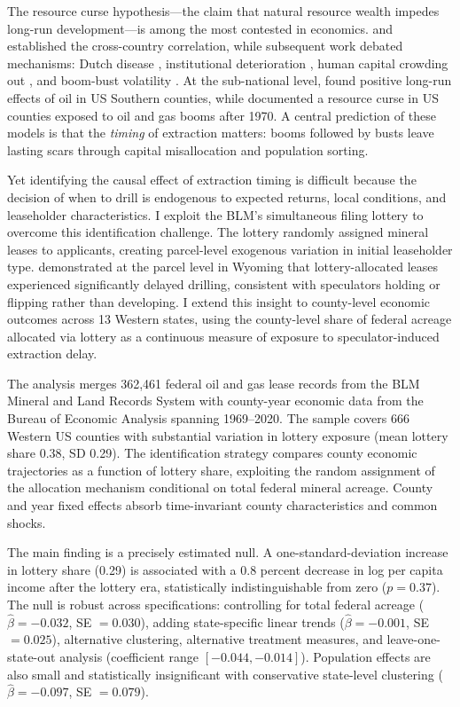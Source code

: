 \documentclass[12pt]{article}
\begin{document}
The resource curse hypothesis---the claim that natural resource wealth impedes long-run development---is among the most contested in economics. \citet{sachs1995natural} and \citet{sachs2001curse} established the cross-country correlation, while subsequent work debated mechanisms: Dutch disease \citep{corden1984booming}, institutional deterioration \citep{mehlum2006institutions, robinson2006governance}, human capital crowding out \citep{gylfason2001natural}, and boom-bust volatility \citep{vanderploeg2011natural}. At the sub-national level, \citet{michaels2011comparative} found positive long-run effects of oil in US Southern counties, while \citet{allcott2018dutch} documented a resource curse in US counties exposed to oil and gas booms after 1970. A central prediction of these models is that the \textit{timing} of extraction matters: booms followed by busts leave lasting scars through capital misallocation and population sorting.

Yet identifying the causal effect of extraction timing is difficult because the decision of when to drill is endogenous to expected returns, local conditions, and leaseholder characteristics. I exploit the BLM's simultaneous filing lottery to overcome this identification challenge. The lottery randomly assigned mineral leases to applicants, creating parcel-level exogenous variation in initial leaseholder type. \citet{brehm2021speculator} demonstrated at the parcel level in Wyoming that lottery-allocated leases experienced significantly delayed drilling, consistent with speculators holding or flipping rather than developing. I extend this insight to county-level economic outcomes across 13 Western states, using the county-level share of federal acreage allocated via lottery as a continuous measure of exposure to speculator-induced extraction delay.

The analysis merges 362,461 federal oil and gas lease records from the BLM Mineral and Land Records System with county-year economic data from the Bureau of Economic Analysis spanning 1969--2020. The sample covers 666 Western US counties with substantial variation in lottery exposure (mean lottery share 0.38, SD 0.29). The identification strategy compares county economic trajectories as a function of lottery share, exploiting the random assignment of the allocation mechanism conditional on total federal mineral acreage. County and year fixed effects absorb time-invariant county characteristics and common shocks.

The main finding is a precisely estimated null. A one-standard-deviation increase in lottery share (0.29) is associated with a 0.8 percent decrease in log per capita income after the lottery era, statistically indistinguishable from zero ($p = 0.37$). The null is robust across specifications: controlling for total federal acreage ($\hat{\beta} = -0.032$, SE $= 0.030$), adding state-specific linear trends ($\hat{\beta} = -0.001$, SE $= 0.025$), alternative clustering, alternative treatment measures, and leave-one-state-out analysis (coefficient range $[-0.044, -0.014]$). Population effects are also small and statistically insignificant with conservative state-level clustering ($\hat{\beta} = -0.097$, SE $= 0.079$).
\end{document}
